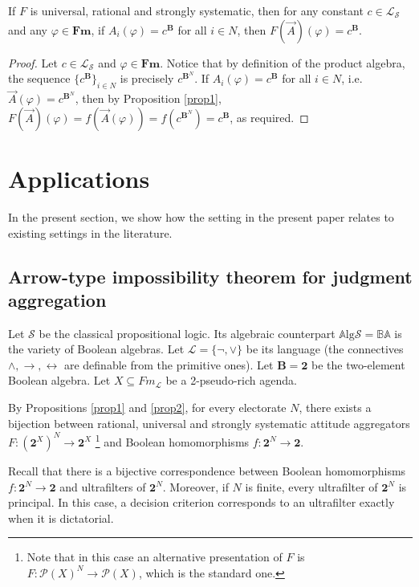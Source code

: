 \documentclass{llncs}
\numberwithin{equation}{section}
\newcommand{\Sm}{\mathcal{S}}   \newcommand{\Lm}{\mathcal{L}}  \newcommand{\Fm}{\mathbf{Fm}}  \newcommand{\Hom}{\mathrm{Hom}}   \newcommand{\Al}{\mathbf{A}}  \newcommand{\BB}{\mathbf{B}}   \newcommand{\Alg}{\mathbb{A}\mathrm{lg}}
\newcommand{\s}{\mathcal{S}}
\newcommand{\Ls}{\mathcal{L}_{\s}}
\begin{document}
\begin{corollary}
If $F$ is universal, rational and strongly systematic, then for any constant $c\in\Ls$ and any $\varphi\in\Fm$, if $A_i(\varphi)=c^{\BB}$ for all $i\in N$, then $F(\vec{A})(\varphi)=c^{\BB}$.
\end{corollary}
\begin{proof}
Let $c\in\Ls$ and $\varphi\in\Fm$.
Notice that by definition of the product algebra, the sequence $\{c^{\BB}\}_{i\in N}$ is precisely $c^{\BB^{N}}$.
If $A_i(\varphi)=c^{\BB}$ for all $i\in N$, i.e.\ $\vec{A}(\varphi)=c^{\BB^{N}}$,
then by Proposition \ref{prop1},
$F(\vec{A})(\varphi)=f(\vec{A}(\varphi))=f(c^{\BB^{N}})=c^{\BB}$, as required.\end{proof}

\section{Applications}
\label{Sec:Arrow}
In the present section, we show how the setting in the present paper relates to existing settings in the literature. \subsection{Arrow-type impossibility theorem for judgment aggregation}
Let $\Sm$ be the classical propositional logic. Its algebraic counterpart $\Alg\Sm=\mathbb{BA}$ is the variety of Boolean algebras. Let $\Lm=\{\neg, \vee\}$ be its language (the connectives $\wedge,\to,\leftrightarrow$ are definable from the primitive ones). Let $\BB=\mathbf{2}$ be the two-element Boolean algebra. Let $X\subseteq Fm_{\Lm}$ be a 2-pseudo-rich agenda.

By Propositions \ref{prop1} and \ref{prop2}, for every electorate $N$, there exists a bijection between rational, universal and strongly systematic attitude aggregators $F:(\mathbf{2}^{X})^{N}\longrightarrow \mathbf{2}^{X}$
\footnote{Note that in this case an alternative presentation of $F$ is $F:\mathcal{P}(X)^{N}\longrightarrow \mathcal{P}(X)$, which is the standard one.}
and Boolean homomorphisms $f:\mathbf{2}^{N}\longrightarrow \mathbf{2}$.

Recall that there is a bijective correspondence between Boolean homomorphisms $f:\mathbf{2}^{N}\longrightarrow\mathbf{2}$ and ultrafilters of $\mathbf{2}^N$. Moreover, if $N$ is finite, every ultrafilter of $\mathbf{2}^N$ is principal. In this case, a decision criterion corresponds to an ultrafilter exactly when it is dictatorial.
\end{document}
